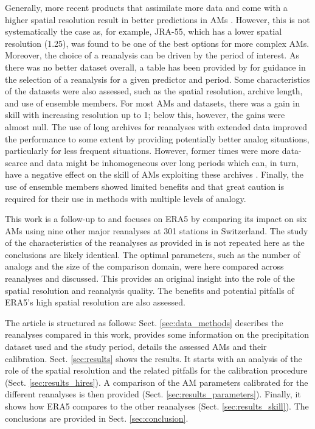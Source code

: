 \documentclass[alpha-refs]{wiley-article}
\begin{document}
Generally, more recent products that assimilate more data and come with a higher spatial resolution result in better predictions in AMs \citep{Horton2018b}. However, this is not systematically the case as, for example, JRA-55, which has a lower spatial resolution (1.25\degree), was found to be one of the best options for more complex AMs. Moreover, the choice of a reanalysis can be driven by the period of interest. As there was no better dataset overall, a table has been provided by \citet{Horton2018b} for guidance in the selection of a reanalysis for a given predictor and period. Some characteristics of the datasets were also assessed, such as the spatial resolution, archive length, and use of ensemble members. For most AMs and datasets, there was a gain in skill with increasing resolution up to 1\degree; below this, however, the gains were almost null. The use of long archives for reanalyses with extended data improved the performance to some extent by providing potentially better analog situations, particularly for less frequent situations. However, former times were more data-scarce and data might be inhomogeneous over long periods which can, in turn, have a negative effect on the skill of AMs exploiting these archives \citep{Horton2018b}. Finally, the use of ensemble members showed limited benefits and that great caution is required for their use in methods with multiple levels of analogy.

This work is a follow-up to \citet{Horton2018b} and focuses on ERA5 by comparing its impact on six AMs using nine other major reanalyses at 301 stations in Switzerland. The study of the characteristics of the reanalyses as provided in \citet{Horton2018b} is not repeated here as the conclusions are likely identical. The optimal parameters, such as the number of analogs and the size of the comparison domain, were here compared across reanalyses and discussed. This provides an original insight into the role of the spatial resolution and reanalysis quality. The benefits and potential pitfalls of ERA5’s high spatial resolution are also assessed.

The article is structured as follows: Sect. \ref{sec:data_methods} describes the reanalyses compared in this work, provides some information on the precipitation dataset used and the study period, details the assessed AMs and their calibration. Sect. \ref{sec:results} shows the results. It starts with an analysis of the role of the spatial resolution and the related pitfalls for the calibration procedure (Sect. \ref{sec:results_hires}). A comparison of the AM parameters calibrated for the different reanalyses is then provided (Sect. \ref{sec:results_parameters}). Finally, it shows how ERA5 compares to the other reanalyses (Sect. \ref{sec:results_skill}). The conclusions are provided in Sect. \ref{sec:conclusion}.
\end{document}

